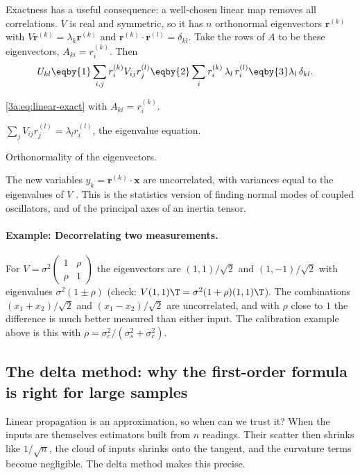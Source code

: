Exactness has a useful consequence: a well-chosen linear map removes all
correlations. $V$ is real and symmetric, so it has $n$
orthonormal eigenvectors $\bm r^{(k)}$ with $V\bm r^{(k)}=\lambda_k\bm r^{(k)}$
and $\bm r^{(k)}\cdot\bm r^{(l)}=\delta_{kl}$. Take the rows of $A$ to be these
eigenvectors, $A_{ki}=r^{(k)}_i$. Then
\begin{align}
  U_{kl}
  &\eqby{1} \sum_{i,j}r^{(k)}_iV_{ij}r^{(l)}_j
   \eqby{2} \sum_ir^{(k)}_i\,\lambda_l\,r^{(l)}_i
   \eqby{3} \lambda_l\,\delta_{kl} .
  \label{3a:eq:decorrelate}
\end{align}
\begin{explain}
  \item \eqref{3a:eq:linear-exact} with $A_{ki}=r^{(k)}_i$.
  \item $\sum_jV_{ij}r^{(l)}_j=\lambda_lr^{(l)}_i$, the eigenvalue equation.
  \item Orthonormality of the eigenvectors.
\end{explain}
The new variables $y_k=\bm r^{(k)}\cdot\bm x$ are uncorrelated, with variances
equal to the eigenvalues of $V$ . This is the
statistics version of finding normal modes of coupled oscillators, and
of the principal axes of an inertia tensor.

\paragraph{Example: Decorrelating two measurements.}
\label{3a:ex:decorrelate}
For $V=\sigma^2\begin{pmatrix}1&\rho\\\rho&1\end{pmatrix}$ the eigenvectors are
$(1,1)/\sqrt2$ and $(1,-1)/\sqrt2$ with eigenvalues $\sigma^2(1\pm\rho)$ (check:
$V(1,1)\T=\sigma^2(1+\rho)(1,1)\T$). The combinations $(x_1+x_2)/\sqrt2$ and
$(x_1-x_2)/\sqrt2$ are uncorrelated, and with $\rho$ close to $1$ the
difference is much better measured than either input. The calibration example
above is this with $\rho=\sigma_c^2/(\sigma_s^2+\sigma_c^2)$.

\subsection{The delta method: why the first-order formula is right for large samples}
\label{3a:sec:delta}

Linear propagation is an approximation, so when can we trust it? When the
inputs are themselves estimators built from $n$ readings. Their scatter then
shrinks like $1/\sqrt n$, the cloud of inputs shrinks onto the tangent, and
the curvature terms become negligible. The delta method makes this precise.

